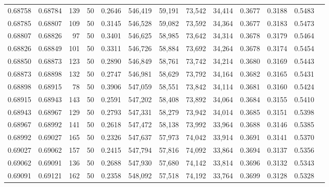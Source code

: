 \begin{tabular}{rrrrrrrrrrrrr}
0.68758 & 0.68784 &   139 &  50 &                                     0.2646 & 546,419 &  59,191 &  73,542 &  34,414 & 0.3677 & 0.3188 & 0.5483 \\
0.68785 & 0.68807 &   109 &  50 &                                     0.3145 & 546,528 &  59,082 &  73,592 &  34,364 & 0.3677 & 0.3183 & 0.5473 \\
0.68807 & 0.68826 &    97 &  50 &                                     0.3401 & 546,625 &  58,985 &  73,642 &  34,314 & 0.3678 & 0.3179 & 0.5464 \\
0.68826 & 0.68849 &   101 &  50 &                                     0.3311 & 546,726 &  58,884 &  73,692 &  34,264 & 0.3678 & 0.3174 & 0.5454 \\
0.68850 & 0.68873 &   123 &  50 &                                     0.2890 & 546,849 &  58,761 &  73,742 &  34,214 & 0.3680 & 0.3169 & 0.5443 \\
0.68873 & 0.68898 &   132 &  50 &                                     0.2747 & 546,981 &  58,629 &  73,792 &  34,164 & 0.3682 & 0.3165 & 0.5431 \\
0.68898 & 0.68915 &    78 &  50 &                                     0.3906 & 547,059 &  58,551 &  73,842 &  34,114 & 0.3681 & 0.3160 & 0.5424 \\
0.68915 & 0.68943 &   143 &  50 &                                     0.2591 & 547,202 &  58,408 &  73,892 &  34,064 & 0.3684 & 0.3155 & 0.5410 \\
0.68943 & 0.68967 &   129 &  50 &                                     0.2793 & 547,331 &  58,279 &  73,942 &  34,014 & 0.3685 & 0.3151 & 0.5398 \\
0.68967 & 0.68992 &   141 &  50 &                                     0.2618 & 547,472 &  58,138 &  73,992 &  33,964 & 0.3688 & 0.3146 & 0.5385 \\
0.68992 & 0.69027 &   165 &  50 &                                     0.2326 & 547,637 &  57,973 &  74,042 &  33,914 & 0.3691 & 0.3141 & 0.5370 \\
0.69027 & 0.69062 &   157 &  50 &                                     0.2415 & 547,794 &  57,816 &  74,092 &  33,864 & 0.3694 & 0.3137 & 0.5356 \\
0.69062 & 0.69091 &   136 &  50 &                                     0.2688 & 547,930 &  57,680 &  74,142 &  33,814 & 0.3696 & 0.3132 & 0.5343 \\
0.69091 & 0.69121 &   162 &  50 &                                     0.2358 & 548,092 &  57,518 &  74,192 &  33,764 & 0.3699 & 0.3128 & 0.5328 \\

\end{tabular}
